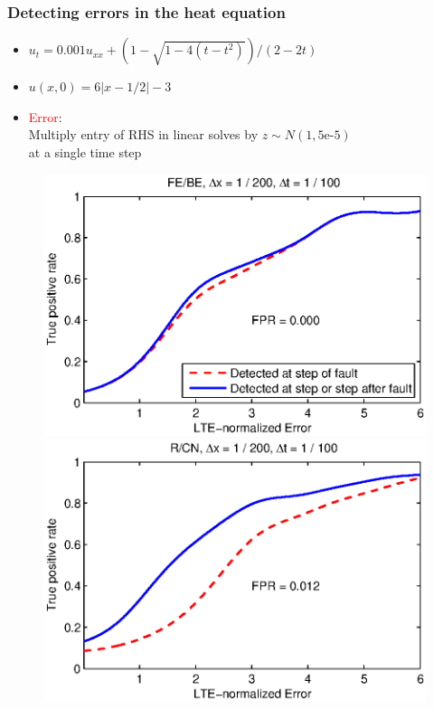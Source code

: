 \documentclass{beamer}
\begin{document}
%
\begin{frame}
\frametitle{Detecting errors in the heat equation}

\begin{itemize}
\item  $u_t = 0.001u_{xx} + (1 - \sqrt{1 - 4(t - t^2)}) / (2 - 2t)$
\item  $u(x, 0) = 6|x - 1/2| - 3$
\item \textcolor{red}{Error}: \\
Multiply entry of RHS in linear solves by $z \sim N(1, 5\text{e-5})$ \\
at a single time step
\end{itemize}

\vspace{-0.5cm}
\begin{figure}
  \includegraphics[scale=0.5]{figs/heat_2a_BE.eps}
  \includegraphics[scale=0.5]{figs/heat_2a_CN.eps}
\end{figure}

\end{frame}
\end{document}
